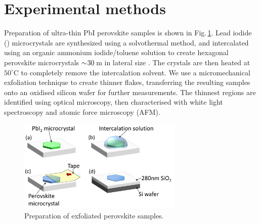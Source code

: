 \section{Experimental methods}
Preparation of ultra-thin PbI perovskite samples is shown in Fig.\,\ref{5Fig1}. Lead iodide () microcrystals are synthesized using a solvothermal method, and intercalated using an organic ammonium iodide/toluene solution to create hexagonal perovskite microcrystals $\sim\negmedspace30\,$\textmu m in lateral size \cite{Saikumar2012}. The crystals are then heated at $50^{\circ}$C to completely remove the intercalation solvent. We use a micromechanical exfoliation technique to create thinner flakes, transferring the resulting samples onto an oxidised silicon wafer for further measurements. The thinnest regions are identified using optical microscopy, then characterised with white light spectroscopy and atomic force microscopy (AFM).
\begin{figure}[h!] 
\centering    
\includegraphics[width=0.7\textwidth]{Fig1}
\caption{Preparation of exfoliated perovskite samples.}
\label{5Fig1}
\end{figure}

